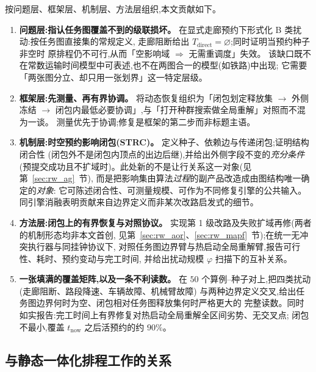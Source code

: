 \documentclass[manuscript,screen,review]{acmart}
\providecommand{\STRC}{\textsc{STRC}}
\newcommand{\ClosureAliveFrac}{90\%}
\begin{document}
按问题层、框架层、机制层、方法层组织,本文贡献如下。

\begin{enumerate}[leftmargin=1.6em,itemsep=0.4em]
\item \textbf{问题层:指认任务图覆盖不到的级联损坏。}
在显式走廊预约下形式化 B 类扰动:按任务图直接集的常规定义,
走廊阻断给出 \(T_{\mathrm{direct}}=\varnothing\);同时证明当预约种子非空时
原排程仍不可行,从而「空影响域 \(\Rightarrow\) 无需重调度」失效。
该缺口既不在常数运输时间模型中可表述,也不在两图合一的模型(如铁路)中出现;
它需要「两张图分立、却只用一张划界」这一特定层级。

\item \textbf{框架层:先测量、再有界协调。}
将动态恢复组织为「闭包划定释放集 \(\rightarrow\) 外侧冻结 \(\rightarrow\)
闭包内最低必要协调」,与「打开种群搜索做全局重解」对照而不混为一谈。
测量优先于协调;修复是框架的第二步而非标题主语。

\item \textbf{机制层:时空预约影响闭包(\STRC)。}
定义种子、依赖边与传递闭包;证明结构闭合性
(闭包外不是闭包内顶点的出边后继),并给出外侧字段不变的\emph{充分条件}
(预提交成功且不扩域时)。此处新的不是让行关系这一对象(见第~\ref{sec:rw_ag}~节),
而是把影响集由算法\emph{过程}的副产品改造成由图结构唯一确定的\emph{对象}:
它可陈述闭合性、可测量规模、可作为不同修复引擎的公共输入。
同引擎消融表明贡献来自边界定义而非某次改路启发式的细节。

\item \textbf{方法层:闭包上的有界恢复与对照协议。}
实现第 1 级改路及失败扩域再修(两者的机制形态均非本文首创,
见第~\ref{sec:rw_aor}、\ref{sec:rw_mapf}~节);在统一无冲突执行器与同挂钟协议下,
对照任务图边界臂与热启动全局重解臂,报告可行性、耗时、预约变动与完工时间,
并给出扰动规模 \(\varphi\) 扫描下的互补关系。

\item \textbf{一张填满的覆盖矩阵,以及一条不利读数。}
在 $50$ 个算例--种子对上,把四类扰动(走廊阻断、路段降速、车辆故障、机械臂故障)
与两种边界定义交叉,给出任务图边界何时为空、闭包相对任务图释放集何时严格更大的
完整读数。同时如实报告:完工时间上有界修复对热启动全局重解全区间劣势、无交叉点;
闭包不最小,覆盖 \(t_{\mathrm{now}}\) 之后活预约的约 \(\ClosureAliveFrac\)。
\end{enumerate}

\subsection{与静态一体化排程工作的关系}
\label{sec:relation_static}
\end{document}
